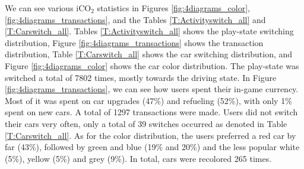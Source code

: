 \documentclass[preprint,authoryear,12pt]{elsarticle}
\begin{document}

We can see various iCO$_2$ statistics in 
Figures \ref{fig:4diagrams_color}, \ref{fig:4diagrams_transactions}, and the Tables \ref{T:Activityswitch_all} and \ref{T:Carswitch_all}. 
Tables \ref{T:Activityswitch_all} shows the play-state switching distribution, Figure \ref{fig:4diagrams_transactions} shows the transaction distribution, Table \ref{T:Carswitch_all} shows the car switching distribution, and Figure \ref{fig:4diagrams_color} shows the car color distribution. The play-state was switched a total of 7802 times, mostly towards the driving state. In Figure \ref{fig:4diagrams_transactions}, we can see how users spent their in-game currency. Most of it was spent on car upgrades (47\%) and refueling (52\%), with only 1\% spent on new cars. A total of 1297 transactions were made. Users did not switch their cars very often, only a total of 39 switches occurred as denoted in Table \ref{T:Carswitch_all}. As for the color distribution, the users preferred a red car by far (43\%), followed by green and blue (19\% and 20\%) and the less popular white (5\%), yellow (5\%) and grey (9\%). In total, cars were recolored 265 times.
\end{document}
